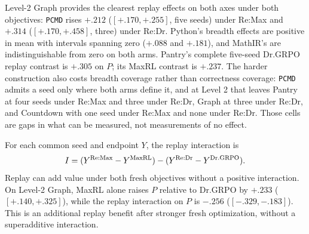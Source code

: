 \documentclass{article}
\makeatletter
\newcommand{\1}{\mathbf 1}
\newcommand{\pmd}{\texttt{PCMD}}
\newcommand{\distk}{\texttt{distinct@8}}
\theoremstyle{remark}
\theoremstyle{definition}
\theoremstyle{plain}
\makeatother
\begin{document}
Level-2 Graph provides the clearest replay effects on both axes under both
objectives: \pmd{} rises $+.212$ ($[+.170,+.255]$, five seeds) under Re:Max and
$+.314$ ($[+.170,+.458]$, three) under Re:Dr. Python's breadth effects are
positive in mean with intervals spanning zero ($+.088$ and $+.181$), and
MathIR's are indistinguishable from zero on both arms. Pantry's complete
five-seed Dr.GRPO replay contrast is $+.305$ on $P$; its MaxRL contrast is
$+.237$. The harder construction also costs breadth coverage rather than
correctness coverage: \pmd{} admits a seed only where both arms define it, and
at Level 2 that leaves Pantry at four seeds under Re:Max and three under Re:Dr,
Graph at three under Re:Dr, and Countdown with one seed under Re:Max and none
under Re:Dr. Those cells are gaps in what can be measured, not measurements of
no effect.

For each common seed and endpoint $Y$, the replay interaction is
\[
 I=(Y^{\rm Re:Max}-Y^{\rm MaxRL})
    -(Y^{\rm Re:Dr}-Y^{\rm Dr.GRPO}).
\]
Replay can add value under both fresh objectives without a positive
interaction. On Level-2 Graph, MaxRL alone raises $P$ relative to Dr.GRPO
by $+.233$ ($[+.140,+.325]$), while the replay interaction on $P$ is
$-.256$ ($[-.329,-.183]$). This is an additional replay benefit after
stronger fresh optimization, without a superadditive interaction.

\begin{table}[H]
  \centering
  \caption{\textbf{Fresh-objective effects and replay interactions on Level 2.}
  All three contrasts within a domain use the same four-arm seed
  intersection. The interaction is
  $(\mathrm{Re:Max}-\mathrm{MaxRL})-
  (\mathrm{Re:Dr}-\mathrm{Dr.GRPO})$.
  Each entry gives its mean and, only for a complete five-seed block, a
  paired unadjusted 95\% Student-$t$ interval. This is the one table that keeps
  the \distk{} axis: an interaction needs both differences on the same seed, and
  at Level 2 the seeds where all four arms define \pmd{} number five only on
  Python, four on MathIR, three on Graph, two on PantryPlan and none on
  Countdown --- too thin to carry the estimand. Archived four-arm exports:
  \href{https://huggingface.co/od2961/maxent-grpo-models/blob/main/experiments/E119/README.md\#models}{model index for the Level-2 factorial}, one export per arm and seed.}
  \label{tab:level2-factorial-contrasts}
  \scriptsize
  \setlength{\tabcolsep}{3pt}
\end{table}
\end{document}
